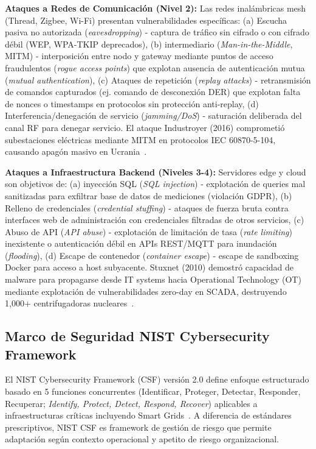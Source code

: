 \textbf{Ataques a Redes de Comunicación (Nivel 2):} Las redes inalámbricas mesh (Thread, Zigbee, Wi-Fi) presentan vulnerabilidades específicas: (a) Escucha pasiva no autorizada (\textit{eavesdropping}) - captura de tráfico sin cifrado o con cifrado débil (WEP, WPA-TKIP deprecados), (b) intermediario (\textit{Man-in-the-Middle}, MITM) - interposición entre nodo y gateway mediante puntos de acceso fraudulentos (\textit{rogue access points}) que explotan ausencia de autenticación mutua (\textit{mutual authentication}), (c) Ataques de repetición (\textit{replay attacks}) - retransmisión de comandos capturados (ej. comando de desconexión DER) que explotan falta de nonces o timestamps en protocolos sin protección anti-replay, (d) Interferencia/denegación de servicio (\textit{jamming/DoS}) - saturación deliberada del canal RF para denegar servicio. El ataque Industroyer (2016) comprometió subestaciones eléctricas mediante MITM en protocolos IEC 60870-5-104, causando apagón masivo en Ucrania~\cite{alsuwaidiSecuringSmartGrid2024}.

\textbf{Ataques a Infraestructura Backend (Niveles 3-4):} Servidores edge y cloud son objetivos de: (a) inyección SQL (\textit{SQL injection}) - explotación de queries mal sanitizadas para exfiltrar base de datos de mediciones (violación GDPR), (b) Relleno de credenciales (\textit{credential stuffing}) - ataques de fuerza bruta contra interfaces web de administración con credenciales filtradas de otros servicios, (c) Abuso de API (\textit{API abuse}) - explotación de limitación de tasa (\textit{rate limiting}) inexistente o autenticación débil en APIs REST/MQTT para inundación (\textit{flooding}), (d) Escape de contenedor (\textit{container escape}) - escape de sandboxing Docker para acceso a host subyacente. Stuxnet (2010) demostró capacidad de malware para propagarse desde IT systems hacia Operational Technology (OT) mediante explotación de vulnerabilidades zero-day en SCADA, destruyendo 1,000+ centrifugadoras nucleares~\cite{nandalSECURITYRISKSIoT2025}.

\subsection{Marco de Seguridad NIST Cybersecurity Framework}
\label{sec:marco-seguridad-nist}

El NIST Cybersecurity Framework (CSF) versión 2.0 define enfoque estructurado basado en 5 funciones concurrentes (Identificar, Proteger, Detectar, Responder, Recuperar; \textit{Identify, Protect, Detect, Respond, Recover}) aplicables a infraestructuras críticas incluyendo Smart Grids~\cite{alsuwaidiSecuringSmartGrid2024}. A diferencia de estándares prescriptivos, NIST CSF es framework de gestión de riesgo que permite adaptación según contexto operacional y apetito de riesgo organizacional.

